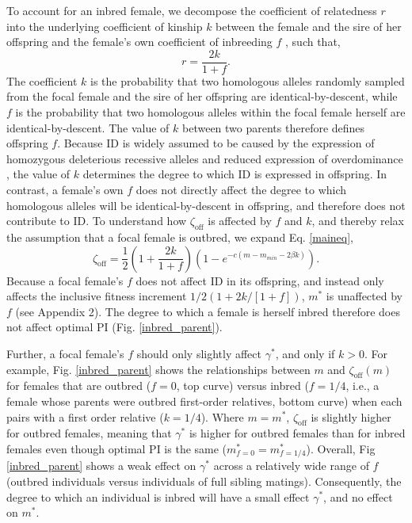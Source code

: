 \documentclass[10pt,letterpaper]{article}
\begin{document}
To account for an inbred female, we decompose the coefficient of relatedness $r$ into the underlying coefficient of kinship $k$ between the female and the sire of her offspring and the female's own coefficient of inbreeding $f$  \cite[see][]{Hamilton1972, Michod1979}, such that,
\begin{equation} \label{rdef}
r = \frac{2k}{1 + f}.
\end{equation}
The coefficient $k$ is the probability that two homologous alleles randomly sampled from the focal female and the sire of her offspring are identical-by-descent, while $f$ is the probability that two homologous alleles within the focal female herself are identical-by-descent. The value of $k$ between two parents therefore defines offspring $f$. Because ID is widely assumed to be caused by the expression of homozygous deleterious recessive alleles and reduced expression of overdominance \cite[][]{Charlesworth2009}, the value of $k$ determines the degree to which ID is expressed in offspring. In contrast, a female's own $f$ does not directly affect the degree to which homologous alleles will be identical-by-descent in offspring, and therefore does not contribute to ID. To understand how $\zeta_{\textrm{off}}$ is affected by $f$ and $k$, and thereby relax the assumption that a focal female is outbred, we expand Eq. \ref{maineq},
\begin{equation} \label{maineqr}
\zeta_{\textrm{off}} = \frac{1}{2}\left(1+\frac{2k}{1+f}\right)\left(1-e^{-c\left(m-m_{min}-2\beta k\right)}\right).
\end{equation}
Because a focal female's $f$ does not affect ID in its offspring, and instead only affects the inclusive fitness increment $1/2\left(1+ 2 k / \left[1 + f\right]\right)$, $m^{*}$ is unaffected by $f$  (see Appendix 2). The degree to which a female is herself inbred therefore does not affect optimal PI (Fig. \ref{inbred_parent}). 

Further, a focal female's $f$ should only slightly affect $\gamma^{*}$, and only if $k>0$. For example, Fig. \ref{inbred_parent} shows the relationships between $m$ and $\zeta_{\textrm{off}}(m)$ for females that are outbred ($f=0$, top curve) versus inbred ($f=1/4$, i.e., a female whose parents were outbred first-order relatives, bottom curve) when each pairs with a first order relative ($k=1/4$). Where $m=m^{*}$, $\zeta_{\textrm{off}}$ is slightly higher for outbred females, meaning that $\gamma^{*}$ is higher for outbred females than for inbred females even though optimal PI is the same ($m^{*}_{f=0}=m^{*}_{f=1/4}$). Overall, Fig \ref{inbred_parent} shows a weak effect on $\gamma^{*}$ across a relatively wide range of $f$ (outbred individuals versus individuals of full sibling matings). Consequently, the degree to which an individual is inbred will have a small effect $\gamma^{*}$, and no effect on $m^{*}$.
\end{document}
